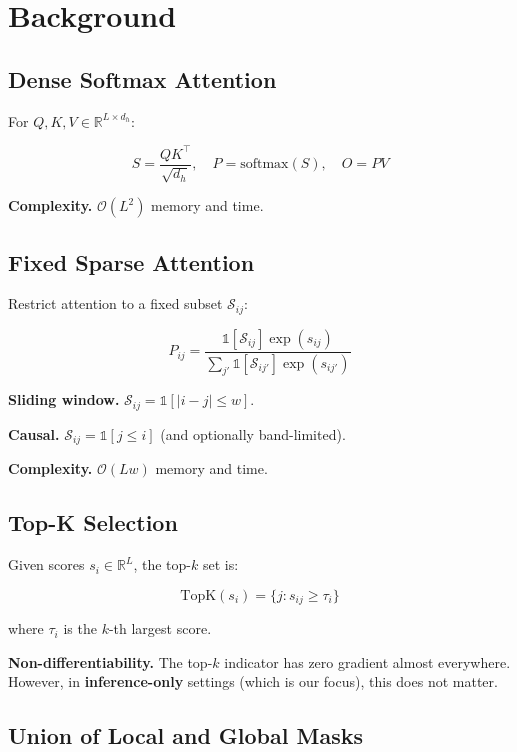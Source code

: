 
\section{Background}

\subsection{Dense Softmax Attention}

For $Q, K, V \in \mathbb{R}^{L \times d_h}$:

\[
S = \frac{QK^\top}{\sqrt{d_h}}, \quad
P = \text{softmax}(S), \quad
O = PV
\tag{3.1}
\]

\textbf{Complexity.} $\mathcal{O}(L^2)$ memory and time.

\subsection{Fixed Sparse Attention}

Restrict attention to a fixed subset $\mathcal{S}_{ij}$:

\[
P_{ij} = \frac{\mathbb{1}[\mathcal{S}_{ij}] \exp(s_{ij})}{\sum_{j'} \mathbb{1}[\mathcal{S}_{ij'}] \exp(s_{ij'})}
\tag{3.2}
\]

\textbf{Sliding window.} $\mathcal{S}_{ij} = \mathbb{1}[|i - j| \leq w]$.

\textbf{Causal.} $\mathcal{S}_{ij} = \mathbb{1}[j \leq i]$ (and optionally band-limited).

\textbf{Complexity.} $\mathcal{O}(L w)$ memory and time.

\subsection{Top-K Selection}

Given scores $s_i \in \mathbb{R}^L$, the top-$k$ set is:

\[
\text{TopK}(s_i) = \{j : s_{ij} \geq \tau_i\}
\tag{3.3}
\]

where $\tau_i$ is the $k$-th largest score.

\textbf{Non-differentiability.} The top-$k$ indicator has zero gradient almost 
everywhere. However, in \textbf{inference-only} settings (which is our focus), 
this does not matter.

\subsection{Union of Local and Global Masks}

